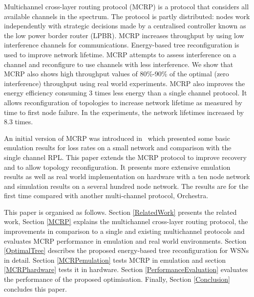 Multichannel cross-layer routing protocol (MCRP) is a protocol that considers all available channels in the spectrum. The protocol is partly distributed: nodes work independently with strategic decisions made by a centralised controller known as the low power border router (LPBR). MCRP increases throughput by using low interference channels for communications.
Energy-based tree reconfiguration is used to improve network lifetime.  MCRP attempts to assess interference on a channel and reconfigure to use channels with less interference.
We show that MCRP also shows high throughput values of 80\%-90\% of the optimal (zero interference) throughput using real world experiments.
MCRP also improves the energy efficiency consuming 3 times less energy than a single channel protocol.  It allows reconfiguration of topologies to increase network lifetime as measured by time to first node failure.  In the experiments, the network lifetimes increased by 8.3 times.

An initial version of MCRP was introduced in~\cite{mcrp} which presented some basic emulation results for loss rates on a small network and comparison with the single channel RPL.  This paper extends the MCRP protocol to improve recovery and to allow topology reconfiguration.  It presents more extensive emulation results as well as real world implementation on hardware with a ten node network and simulation results on a several hundred node network.  The results are for the first time compared with another multi-channel protocol, Orchestra.

This paper is organised as follows. Section \ref{RelatedWork} presents the related work, Section \ref{MCRP} explains the multichannel cross-layer routing protocol, the improvements in comparison to a single and existing multichannel protocols and evaluates MCRP performance in emulation and real world environments.
Section \ref{OptimalTree} describes the proposed energy-based tree reconfiguration for WSNs in detail.  Section \ref{MCRPemulation} tests MCRP in emulation and section \ref{MCRPhardware} tests it in hardware.
Section \ref{PerformanceEvaluation} evaluates the performance of the proposed optimisation. Finally, Section \ref{Conclusion} concludes this paper.
